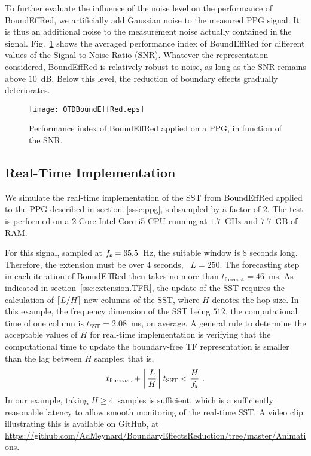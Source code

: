 To further evaluate the influence of the noise level on the performance of {\sf BoundEffRed}, we artificially add Gaussian noise to the measured PPG signal. It is thus an additional noise to the measurement noise actually contained in the signal. Fig.~\ref{fig:otd.noise} shows the averaged performance index of {\sf BoundEffRed} for different values of the Signal-to-Noise Ratio (SNR). Whatever the representation considered, {\sf BoundEffRed} is relatively robust to noise, as long as the SNR remains above $10$~dB. Below this level, the reduction of boundary effects gradually deteriorates.

\begin{figure}
\centering
\texttt{[image: OTDBoundEffRed.eps]}
\caption{Performance index of {\sf BoundEffRed} applied on a PPG, in function of the SNR.}
\label{fig:otd.noise}
\end{figure}


\subsection{Real-Time Implementation}
We simulate the real-time implementation of the SST from {\sf BoundEffRed} applied to the PPG described in section~\ref{ssse:ppg}, subsampled by a factor of $2$. The test is performed on a 2-Core Intel Core i5 CPU running at $1.7$~GHz and $7.7$~GB of RAM. 

For this signal, sampled at $f_{\mathsf s}=65.5$~Hz, the suitable window is $8$ seconds long. Therefore, the extension must be over $4$ seconds, \ie~$L=250$. The forecasting step in each iteration of {\sf BoundEffRed} then takes no more than $t_{\mathrm{forecast}}=46$~ms. As indicated in section~\ref{sse:extension.TFR}, the update of the SST requires the calculation of $\lceil L/H \rceil$ new columns of the SST, where $H$ denotes the hop size. In this example, the frequency dimension of the SST being $512$, the computational time of one column is $t_{\mathrm{SST}}=2.08$~ms, on average. A general rule to determine the acceptable values of $H$ for real-time implementation is verifying that the computational time to update the boundary-free TF representation is smaller than the lag between $H$ samples; that is,
\[
t_{\mathrm{forecast}} + \left\lceil \frac{L}H \right\rceil t_{\mathrm{SST}} < \frac{H}\fs\ . 
\]
In our example, taking $H\geq 4$~samples is sufficient, which is a sufficiently reasonable latency to allow smooth monitoring of the real-time SST.  A video clip illustrating this is available on GitHub, at \url{https://github.com/AdMeynard/BoundaryEffectsReduction/tree/master/Animations}. 